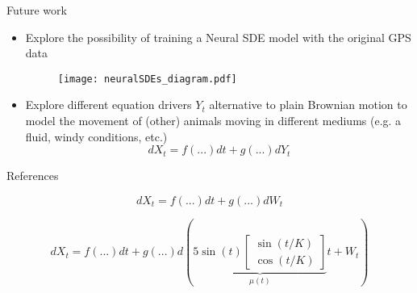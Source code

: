 \documentclass[
    aspectratio=169,
    10pt,
]{beamer}
\begin{document}
\begin{frame}{Future work}
    \begin{itemize}
        \pause
        \item Explore the possibility of training a Neural SDE model with the original GPS data 
        \begin{figure}
            \centering
            \texttt{[image: neuralSDEs\_diagram.pdf]}
        \end{figure}
        \pause
        \item Explore different equation drivers \(Y_t\) alternative to plain Brownian motion to model the movement of (other) animals moving in different mediums (e.g. a fluid, windy conditions, etc.)
        \[
            dX_t = f(...) dt + g(...) dY_t
        \]
    \end{itemize}
\end{frame}

\begin{frame}{References}

\nocite{*}
\printbibliography
    
\end{frame}


\begin{frame}
\Huge
\[  
    dX_t = f(...) dt + g(...) dW_t
\]
    
\end{frame}
\begin{frame}
\LARGE
\[  
    dX_t = f(...) dt + g(...) d\left(
        \underbrace{5\sin(t)\begin{bmatrix}
            \sin(t / K) \\
            \cos(t / K)
        \end{bmatrix}}_{\mu(t)} t + W_t
    \right)
\]
    
\end{frame}
\end{document}
